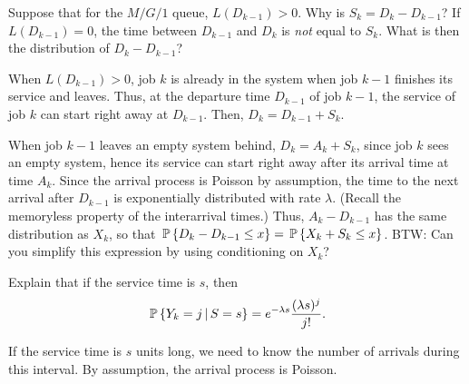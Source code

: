 \begin{question}
  Suppose that for the $M/G/1$ queue, $L(D_{k-1})>0$. Why is
  $S_k = D_k - D_{k-1}$?  If $L(D_{k-1}) = 0$, the time between
  $D_{k-1}$ and $D_k$ is \emph{not} equal to $S_k$. What is then the
  distribution of $D_k-D_{k-1}$?
\begin{solution}
  When $L(D_{k-1})>0$, job $k$ is already in the system when job $k-1$
  finishes its service and leaves. Thus, at the departure time
  $D_{k-1}$ of job $k-1$, the service of job $k$ can start right away
  at $D_{k-1}$. Then, $D_k=D_{k-1}+S_k$.


    When job $k-1$ leaves an empty system behind, $D_k= A_k + S_k$,
    since job $k$ sees an empty system, hence its service can start
    right away after its arrival time at time $A_k$. Since the arrival
    process is Poisson by assumption, the time to the next arrival
    after $D_{k-1}$ is exponentially distributed with rate
    $\lambda$. (Recall the memoryless property of the interarrival
    times.) Thus, $A_k - D_{k-1}$ has the same distribution as $X_k$,
    so that $\P{D_k - D_{k-1} \leq x} = \P{X_k + S_k\leq x}$. BTW: Can
    you simplify this expression by using conditioning on $X_k$?
\end{solution}
\end{question}

\begin{question}
 Explain that if the service time is $s$, then
\begin{equation}\label{eq:4}
  \P{Y_k = j\given S=s} = e^{-\lambda s}\frac{(\lambda s)^j}{j!}.
\end{equation}
  \begin{solution}
If the service time is $s$ units long, we need to know the number of arrivals during this interval. By assumption, the arrival process is Poisson. 
  \end{solution}
\end{question}

